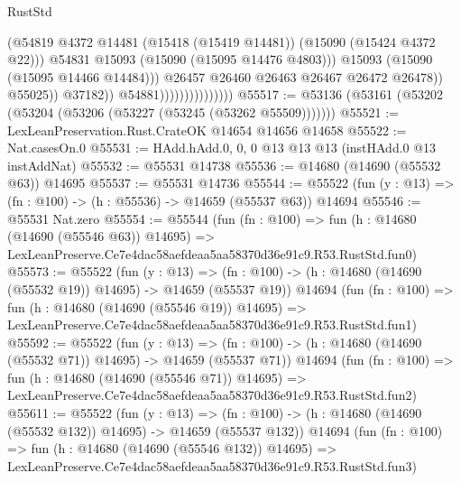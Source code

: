 \begin{lexlean}{RustStd}
\begin{coremodule}
                                                  (@54819
                                                    @4372
                                                    @14481
                                                    (@15418 (@15419 @14481))
                                                    (@15090 (@15424 @4372 @22)))
                                                  @54831
                                                  @15093
                                                  (@15090 (@15095 @14476 @4803)))
                                                @15093
                                                (@15090 (@15095 @14466 @14484)))
                                              @26457
                                              @26460
                                              @26463
                                              @26467
                                              @26472
                                              @26478))
                                          @55025))
                                      @37182))
                                  @54881)))))))))))))))
@55517 := @53136 (@53161 (@53202 (@53204 (@53206 (@53227 (@53245 (@53262 @55509)))))))
@55521 := LexLeanPreservation.Rust.CrateOK @14654 @14656 @14658
@55522 := Nat.casesOn.{0}
@55531 := HAdd.hAdd.{0, 0, 0} @13 @13 @13 (instHAdd.{0} @13 instAddNat)
@55532 := @55531 @14738
@55536 := @14680 (@14690 (@55532 @63)) @14695
@55537 := @55531 @14736
@55544 := @55522 (fun (y : @13) => (fn : @100) -> (h : @55536) -> @14659 (@55537 @63)) @14694
@55546 := @55531 Nat.zero
@55554 := @55544
    (fun (fn : @100) =>
    fun (h : @14680 (@14690 (@55546 @63)) @14695) =>
    LexLeanPreserve.Ce7e4dac58aefdeaa5aa58370d36e91c9.R53.RustStd.fun0)
@55573 := @55522
    (fun (y : @13) =>
    (fn : @100) -> (h : @14680 (@14690 (@55532 @19)) @14695) -> @14659 (@55537 @19))
    @14694
    (fun (fn : @100) =>
    fun (h : @14680 (@14690 (@55546 @19)) @14695) =>
    LexLeanPreserve.Ce7e4dac58aefdeaa5aa58370d36e91c9.R53.RustStd.fun1)
@55592 := @55522
    (fun (y : @13) =>
    (fn : @100) -> (h : @14680 (@14690 (@55532 @71)) @14695) -> @14659 (@55537 @71))
    @14694
    (fun (fn : @100) =>
    fun (h : @14680 (@14690 (@55546 @71)) @14695) =>
    LexLeanPreserve.Ce7e4dac58aefdeaa5aa58370d36e91c9.R53.RustStd.fun2)
@55611 := @55522
    (fun (y : @13) =>
    (fn : @100) -> (h : @14680 (@14690 (@55532 @132)) @14695) -> @14659 (@55537 @132))
    @14694
    (fun (fn : @100) =>
    fun (h : @14680 (@14690 (@55546 @132)) @14695) =>
    LexLeanPreserve.Ce7e4dac58aefdeaa5aa58370d36e91c9.R53.RustStd.fun3)

\end{coremodule}
\end{lexlean}
